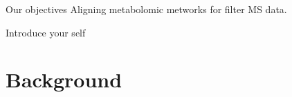 \documentclass[aspectratio=169]{beamer}
\newcommand{\source}[1]{\par\tiny Source: #1} %
\begin{document}
    \begin{frame}{Our objectives}
        Aligning metabolomic metworks for filter MS data.

        \begin{note}
            {Introduce your self}
        \end{note}
    \end{frame}

\section{Background}




\end{document}
